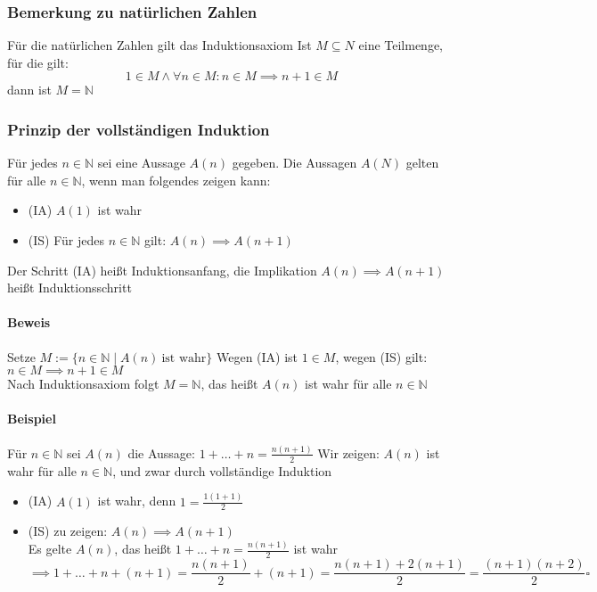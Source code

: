 \documentclass[a4paper]{scrartcl}
\DeclareMathOperator{\Forall}{\forall}
\theoremstyle{definition}
\theoremstyle{plain}
\theoremstyle{plain}
\theoremstyle{remark}
\theoremstyle{remark}
\theoremstyle{remark}
\theoremstyle{remark}
\theoremstyle{remark}
\begin{document}
\subsubsection{Bemerkung zu natürlichen Zahlen}
\label{sec-2-4-14}
Für die natürlichen Zahlen gilt das Induktionsaxiom
Ist $M\subseteq N$ eine Teilmenge, für die gilt:
\[1\in M \wedge \Forall n\in M : n\in M \implies n+1 \in M\]
dann ist $M = \mathbb{N}$
\subsubsection{Prinzip der vollständigen Induktion}
\label{sec-2-4-15}
Für jedes $n\in \mathbb{N}$ sei eine Aussage $A(n)$ gegeben. Die Aussagen $A(N)$ gelten für alle $n\in\mathbb{N}$, wenn man folgendes zeigen kann: \\
\begin{itemize}
\item (IA) $A(1)$ ist wahr
\item (IS) Für jedes $n\in\mathbb{N}$ gilt: $A(n) \implies A(n+1)$
\end{itemize}
Der Schritt (IA) heißt Induktionsanfang, die Implikation $A(n) \implies A(n+1)$ heißt Induktionsschritt
\paragraph{Beweis}
\label{sec-2-4-15-1}
Setze $M := \{n\in \mathbb{N}\mid A(n)~\text{ist wahr}\}$
Wegen (IA) ist $1\in M$, wegen (IS) gilt: $n\in M \implies n+1 \in M$ \\
         Nach Induktionsaxiom folgt $M = \mathbb{N}$, das heißt $A(n)$ ist wahr für alle $n\in \mathbb{N}$
\paragraph{Beispiel}
\label{sec-2-4-15-2}
Für $n\in\mathbb{N}$ sei $A(n)$ die Aussage: $1+\ldots + n = \frac{n(n+1)}{2}$
Wir zeigen: $A(n)$ ist wahr für alle $n\in \mathbb{N}$, und zwar durch vollständige Induktion
\begin{itemize}
\item (IA) $A(1)$ ist wahr, denn $1 = \frac{1(1+1)}{2}$
\item (IS) zu zeigen: $A(n) \implies A(n+1)$ \\
           Es gelte $A(n)$, das heißt $1+\ldots+n = \frac{n(n+1)}{2}$ ist wahr \[\implies 1 + \ldots + n + (n + 1) = \frac{n(n+1)}{2} + (n+1) =  \frac{n(n+1) + 2(n+1)}{2} = \frac{(n+1)(n+2)}{2} \square\]
\end{itemize}
\end{document}
